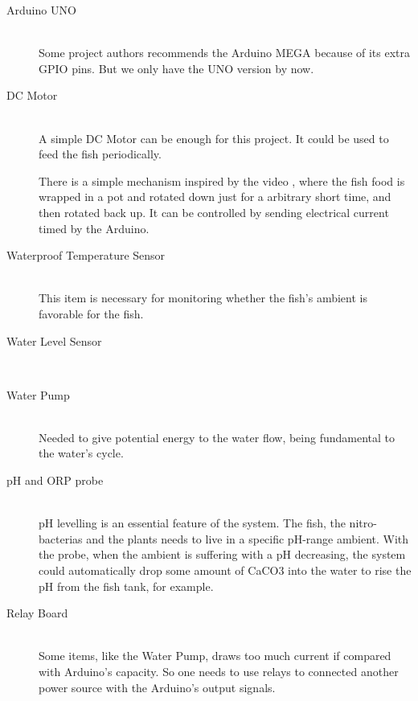 \begin{description}
    \item[Arduino UNO] \hfill \\
        Some project authors recommends the Arduino MEGA because of its extra GPIO pins.
        But we only have the UNO version by now.
    \item[DC Motor] \hfill \\
        A simple DC Motor can be enough for this project.
        It could be used to feed the fish periodically.

        There is a simple mechanism inspired by the video \cite{judoisonattack2012},
        where the fish food is wrapped in a pot and rotated down just for a arbitrary short time,
        and then rotated back up.
        It can be controlled by sending electrical current timed by the Arduino.
    \item[Waterproof Temperature Sensor] \hfill \\
        This item is necessary for monitoring whether the fish's ambient is favorable for the fish.
    \item[Water Level Sensor] \hfill \\
    \item[Water Pump] \hfill \\
        Needed to give potential energy to the water flow,
        being fundamental to the water's cycle.
    \item[pH and ORP probe] \hfill \\
        pH levelling is an essential feature of the system.
        The fish, the nitro-bacterias and the plants needs to live in a specific pH-range ambient.
        With the probe,
        when the ambient is suffering with a pH decreasing,
        the system could automatically drop some amount of CaCO3 into the water to rise the pH from the fish tank,
        for example.
    \item[Relay Board] \hfill \\
        Some items,
        like the Water Pump,
        draws too much current if compared with Arduino's capacity.
        So one needs to use relays to connected another power source with the Arduino's output signals.
\end{description}
